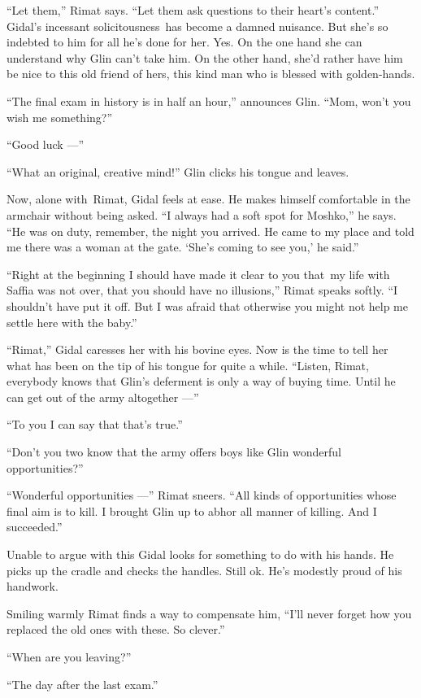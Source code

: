 \documentclass[twoside,11pt,openany]{book}
\begin{document}
``Let them,'' Rimat says. ``Let them ask questions to their heart's
content.'' Gidal's incessant solicitousness~has become a damned nuisance. But she's so indebted to him for
all he's done for her. Yes. On the one hand she can understand why Glin can't take him. On the other hand, she'd rather
have him be nice to this old friend of hers, this kind man who is blessed with golden-hands.

``The final exam in history is in half an hour,'' announces Glin. ``Mom, won't
you wish me something?''

``Good luck ---''

``What an original, creative mind!'' Glin clicks his tongue and leaves.

Now, alone with~Rimat, Gidal feels at ease. He makes himself comfortable in the armchair without being asked.
``I always had a soft spot for Moshko,'' he says. ``He was on duty, remember,
the night you arrived. He came to my place and told me there was a woman at the gate. `She's coming to see you,' he
said.''

``Right at the beginning I should have made it clear to you that~my life with Saffia was not over, that you
should have no illusions,'' Rimat speaks softly. ``I shouldn't have put it off. But I was afraid that otherwise you
might not help me settle here with the baby.''

``Rimat,'' Gidal caresses her with his bovine eyes. Now is the time to tell her what has been
on the tip of his tongue for quite{ }a while. ``Listen, Rimat, everybody knows that Glin's
deferment is only a way of buying time. Until he can get out of the army altogether ---''

``To you I can say that that's true.''

``Don't you two know that the army offers boys like Glin wonderful opportunities?''

``Wonderful opportunities ---'' Rimat sneers. ``All kinds of opportunities whose
final aim is to kill. I brought Glin up to abhor all manner of killing. And I succeeded.''

Unable to argue with this Gidal looks for something to do with his hands. He picks up the cradle and checks the handles.
Still ok. He's modestly proud of his handwork.

Smiling warmly Rimat finds a way to compensate him, ``I'll never forget how you replaced the old ones with
these. So clever.''

``When are you leaving?''

``The day after the last exam.''
\end{document}

